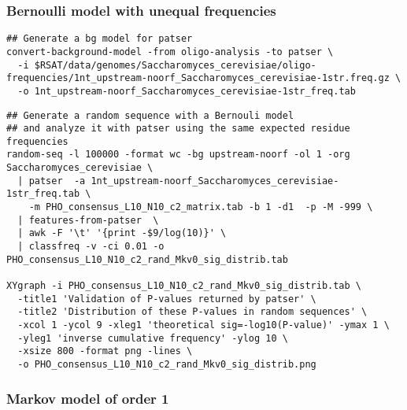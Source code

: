 \subsubsection{Bernoulli model with unequal frequencies}

{\color{Blue} \begin{footnotesize} 
\begin{verbatim}
## Generate a bg model for patser
convert-background-model -from oligo-analysis -to patser \
  -i $RSAT/data/genomes/Saccharomyces_cerevisiae/oligo-frequencies/1nt_upstream-noorf_Saccharomyces_cerevisiae-1str.freq.gz \
  -o 1nt_upstream-noorf_Saccharomyces_cerevisiae-1str_freq.tab
\end{verbatim} \end{footnotesize}
}


{\color{Blue} \begin{footnotesize} 
\begin{verbatim}
## Generate a random sequence with a Bernouli model 
## and analyze it with patser using the same expected residue frequencies
random-seq -l 100000 -format wc -bg upstream-noorf -ol 1 -org Saccharomyces_cerevisiae \
  | patser  -a 1nt_upstream-noorf_Saccharomyces_cerevisiae-1str_freq.tab \
    -m PHO_consensus_L10_N10_c2_matrix.tab -b 1 -d1  -p -M -999 \
  | features-from-patser  \
  | awk -F '\t' '{print -$9/log(10)}' \
  | classfreq -v -ci 0.01 -o PHO_consensus_L10_N10_c2_rand_Mkv0_sig_distrib.tab

XYgraph -i PHO_consensus_L10_N10_c2_rand_Mkv0_sig_distrib.tab \
  -title1 'Validation of P-values returned by patser' \
  -title2 'Distribution of these P-values in random sequences' \
  -xcol 1 -ycol 9 -xleg1 'theoretical sig=-log10(P-value)' -ymax 1 \
  -yleg1 'inverse cumulative frequency' -ylog 10 \
  -xsize 800 -format png -lines \
  -o PHO_consensus_L10_N10_c2_rand_Mkv0_sig_distrib.png 
\end{verbatim} \end{footnotesize}
}


\subsubsection{Markov model of order 1}

